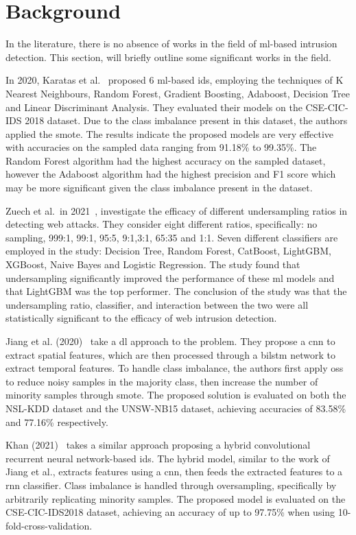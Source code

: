 \chapter{Background}%
\label{chp:background}

In the literature, there is no absence of works in the field of \gls{ml}-based
intrusion detection. This section, will briefly outline some significant works
in the field.

In 2020, Karatas et al.~\cite{Karatas} proposed 6 \gls{ml}-based \gls{ids},
employing the techniques of K Nearest Neighbours, Random Forest, Gradient
Boosting, Adaboost, Decision Tree and Linear Discriminant Analysis. They
evaluated their models on the CSE-CIC-IDS 2018 dataset. Due to the class
imbalance present in this dataset, the authors applied the \gls{smote}. The
results indicate the proposed models are very effective with accuracies on the
sampled data ranging from 91.18\% to 99.35\%. The Random Forest algorithm had
the highest accuracy on the sampled dataset, however the Adaboost algorithm had
the highest precision and F1 score which may be more significant given the
class imbalance present in the dataset.

Zuech et al.\ in 2021~\cite{Zuech}, investigate the efficacy of different
undersampling ratios in detecting web attacks. They consider eight different
ratios, specifically: no sampling, 999:1, 99:1, 95:5, 9:1,3:1, 65:35 and 1:1.
Seven different classifiers are employed in the study: Decision Tree, Random
Forest, CatBoost, LightGBM, XGBoost, Naive Bayes and Logistic Regression. The
study found that undersampling significantly improved the performance of these
\gls{ml} models and that LightGBM was the top performer. The conclusion of the
study was that the undersampling ratio, classifier, and interaction between the
two were all statistically significant to the efficacy of web intrusion
detection.

Jiang et al. (2020)~\cite{Jiang} take a \gls{dl} approach to the problem. They
propose a \gls{cnn} to extract spatial features, which are then processed
through a \gls{bilstm} network to extract temporal features. To handle class
imbalance, the authors first apply \gls{oss} to reduce noisy samples in the
majority class, then increase the number of minority samples through
\gls{smote}. The proposed solution is evaluated on both the NSL-KDD dataset and
the UNSW-NB15 dataset, achieving accuracies of 83.58\% and 77.16\%
respectively.

Khan (2021)~\cite{Khan} takes a similar approach proposing a hybrid
convolutional recurrent neural network-based \gls{ids}. The hybrid model,
similar to the work of Jiang et al., extracts features using a \gls{cnn}, then
feeds the extracted features to a \gls{rnn} classifier. Class imbalance is
handled through oversampling, specifically by arbitrarily replicating minority
samples. The proposed model is evaluated on the CSE-CIC-IDS2018 dataset,
achieving an accuracy of up to 97.75\% when using 10-fold-cross-validation.

